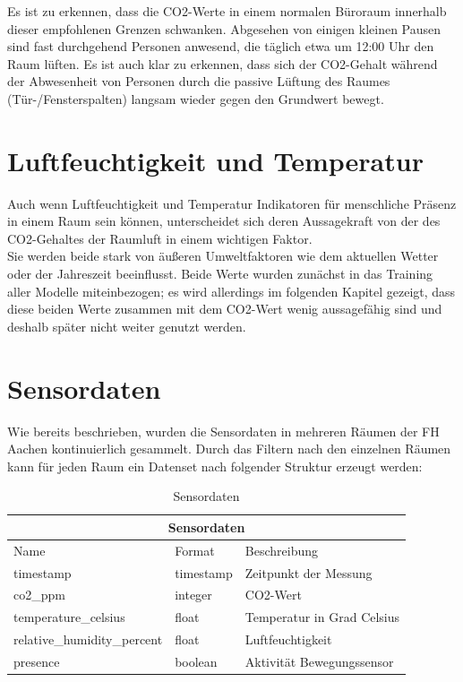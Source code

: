 Es ist zu erkennen, dass die CO2-Werte in einem normalen Büroraum innerhalb dieser empfohlenen Grenzen schwanken.
Abgesehen von einigen kleinen Pausen sind fast durchgehend Personen anwesend, die täglich etwa um 12:00 Uhr den 
Raum lüften.
Es ist auch klar zu erkennen, dass sich der CO2-Gehalt während der Abwesenheit von Personen durch die passive
Lüftung des Raumes (Tür-/Fensterspalten) langsam wieder gegen den Grundwert bewegt.

\newpage
\section{Luftfeuchtigkeit und Temperatur}
Auch wenn Luftfeuchtigkeit und Temperatur Indikatoren für menschliche Präsenz in einem Raum sein können, 
unterscheidet sich deren Aussagekraft von der des CO2-Gehaltes der Raumluft in einem wichtigen Faktor.\\ 
Sie werden beide stark von äußeren Umweltfaktoren wie dem aktuellen Wetter oder der Jahreszeit beeinflusst.
Beide Werte wurden zunächst in das Training aller Modelle miteinbezogen; es wird allerdings im folgenden 
Kapitel gezeigt, dass diese beiden Werte zusammen mit dem CO2-Wert wenig aussagefähig sind und 
deshalb später nicht weiter genutzt werden.  

\section{Sensordaten}
Wie bereits beschrieben, wurden die Sensordaten in mehreren Räumen der FH Aachen kontinuierlich 
gesammelt. Durch das Filtern nach den einzelnen Räumen kann für jeden Raum ein Datenset nach folgender Struktur
erzeugt werden:\\

\begin{table}[ht]
    \caption{Sensordaten}
    \centering
    \begin{tabular}{|p{4.5cm}||p{3cm}|p{5.5cm}|}
        \hline
        \multicolumn{3}{|c|}{Sensordaten} \\
        \hline
        Name&Format &Beschreibung\\
        \hline
        timestamp&timestamp&Zeitpunkt der Messung\\
        co2\_ppm&integer&CO2-Wert\\
        temperature\_celsius&float&Temperatur in Grad Celsius\\
        relative\_humidity\_percent&float&Luftfeuchtigkeit\\
        presence&boolean&Aktivität Bewegungssensor\\
        \hline
    \end{tabular}             
\end{table}

